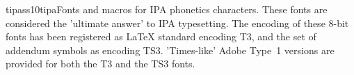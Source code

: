\documentclass{ddltxtyp}
\begin{document}
\begin{package}{tipass10}{tipa}{Fonts and macros for IPA phonetics characters.}
These fonts are considered the 'ultimate answer' to IPA
typesetting. The encoding of these 8-bit fonts has been
registered as {\LaTeX} standard encoding T3, and the set of
addendum symbols as encoding TS3. 'Times-like' Adobe Type~1
versions are provided for both the T3 and the TS3 fonts.
\end{package}
\end{document}
